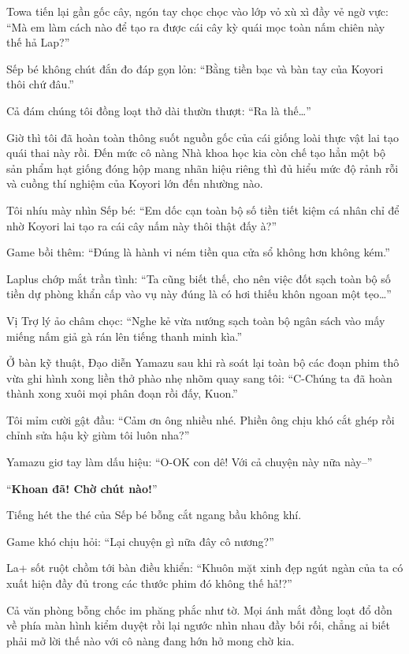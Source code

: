 \documentclass[../main.tex]{subfiles}
\begin{document}
Towa tiến lại gần gốc cây, ngón tay chọc chọc vào lớp vỏ xù xì đầy vẻ ngờ vực: ``Mà em làm cách nào để tạo ra được cái cây kỳ quái mọc toàn nấm chiên này thế hả Lap?''

Sếp bé không chút đắn đo đáp gọn lỏn: ``Bằng tiền bạc và bàn tay của Koyori thôi chứ đâu.''

Cả đám chúng tôi đồng loạt thở dài thườn thượt: ``Ra là thế\dots''

Giờ thì tôi đã hoàn toàn thông suốt nguồn gốc của cái giống loài thực vật lai tạo quái thai này rồi. Đến mức cô nàng Nhà khoa học kia còn chế tạo hẳn một bộ sản phẩm hạt giống đóng hộp mang nhãn hiệu riêng thì đủ hiểu mức độ rảnh rỗi và cuồng thí nghiệm của Koyori lớn đến nhường nào.

Tôi nhíu mày nhìn Sếp bé: ``Em dốc cạn toàn bộ số tiền tiết kiệm cá nhân chỉ để nhờ Koyori lai tạo ra cái cây nấm này thôi thật đấy à?''

Game bồi thêm: ``Đúng là hành vi ném tiền qua cửa sổ không hơn không kém.''

Laplus chớp mắt trần tình: ``Ta cũng biết thế, cho nên việc đốt sạch toàn bộ số tiền dự phòng khẩn cấp vào vụ này đúng là có hơi thiếu khôn ngoan một tẹo\dots''

Vị Trợ lý ảo châm chọc: ``Nghe kẻ vừa nướng sạch toàn bộ ngân sách vào mấy miếng nấm giả gà rán lên tiếng thanh minh kìa.''

Ở bàn kỹ thuật, Đạo diễn Yamazu sau khi rà soát lại toàn bộ các đoạn phim thô vừa ghi hình xong liền thở phào nhẹ nhõm quay sang tôi: ``C-Chúng ta đã hoàn thành xong xuôi mọi phân đoạn rồi đấy, Kuon.''

Tôi mỉm cười gật đầu: ``Cảm ơn ông nhiều nhé. Phiền ông chịu khó cắt ghép rồi chỉnh sửa hậu kỳ giùm tôi luôn nha?''

Yamazu giơ tay làm dấu hiệu: ``O-OK con dê! Với cả chuyện này nữa này--''

``\textbf{Khoan đã! Chờ chút nào!}''

Tiếng hét the thé của Sếp bé bỗng cắt ngang bầu không khí.

Game khó chịu hỏi: ``Lại chuyện gì nữa đây cô nương?''

La+ sốt ruột chồm tới bàn điều khiển: ``Khuôn mặt xinh đẹp ngút ngàn của ta có xuất hiện đầy đủ trong các thước phim đó không thế hả!?''

Cả văn phòng bỗng chốc im phăng phắc như tờ. Mọi ánh mắt đồng loạt đổ dồn về phía màn hình kiểm duyệt rồi lại ngước nhìn nhau đầy bối rối, chẳng ai biết phải mở lời thế nào với cô nàng đang hớn hở mong chờ kia.
\end{document}
